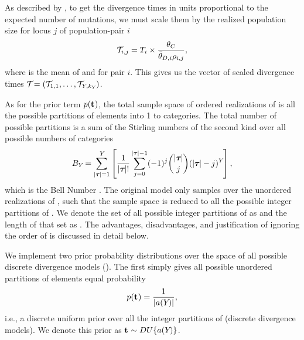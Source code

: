 \begin{linenomath}
As described by \citet{Oaks2012}, to get the divergence times in units
proportional to the expected number of mutations, we must
scale them by the realized population size for locus $j$ of population-pair $i$ 
\begin{equation}
    \divTimeScaled{i}{j} = \divTimeMap{i} \times \frac{\myTheta{C}}{
        \descendantThetaMean{i} \ploidyScalar{i}{j}},
    \label{eq:divTimeScaled}
\end{equation}
where  is the mean of  and
 for pair $i$.
This gives us the vector of scaled divergence times
$\divTimeScaledVector = (\divTimeScaled{1}{1}, \ldots,
\divTimeScaled{\npairs{}}{\nloci{\npairs{}}})$.
\end{linenomath}


\begin{linenomath}
As for the prior term $p(\mathbf{t_{}})$, the total sample space of
ordered realizations of \divTimeIndexVector is all the possible partitions of
\npairs{} elements into 1 to \npairs{} categories.
The total number of possible partitions is a sum of the Stirling numbers of
the second kind over all possible numbers of categories \divTimeNum
\begin{equation}
    B_{Y_{}}=\sum_{\lvert \boldsymbol{\tau_{}} \rvert=1}^{Y_{}} \left[
    \frac{1}{\lvert \boldsymbol{\tau_{}} \rvert!} \sum_{j=0}^{\lvert \boldsymbol{\tau_{}} \rvert-1} (-1)^{j}
    \binom{\lvert \boldsymbol{\tau_{}} \rvert}{j} (\lvert \boldsymbol{\tau_{}} \rvert-j)^{Y_{}} \right],
    \label{eq:bell}
\end{equation}
which is the Bell Number \citep{Bell1934}.
The original \msb model only samples over the unordered realizations of
\divTimeIndexVector, such that the sample space is reduced to all the possible
integer partitions of \npairs{} \citep{Oaks2012,Huang2011,OeisPartitionNumber,
    OeisPartitionTriangle,Malenfant2011}.
We denote the set of all possible integer partitions of \npairs{} as
\integerPartitionSet{\npairs{}} and the length of that set as
\integerPartitionNum{\npairs{}}.
The advantages, disadvantages, and justification of ignoring the order
of \divTimeIndexVector is discussed in detail below.
\end{linenomath}

\begin{linenomath}
We implement two prior probability distributions over the space
of all possible discrete divergence models (\divTimeIndexVector).
The first simply gives all possible unordered partitions of \npairs{} elements
equal probability
\begin{equation}
    p(\mathbf{t_{}}) = \frac{1}{\lvert a({Y_{}}) \rvert},
    \label{eq:divModelPriorUniform}
\end{equation}
i.e., a discrete uniform prior over all the integer partitions of \npairs{}
(discrete divergence models).
We denote this prior as
$\mathbf{t_{}} \sim DU\{a({Y_{}})\}$.
\end{linenomath}


